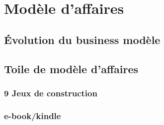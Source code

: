 
\section[Modèle d'affaire]{Modèle d'affaires}

\subsection[Évolution du business modèle]{Évolution du business modèle}
\begin{frame}
\end{frame}

\subsection[Toile de modèle d'affaire]{Toile de modèle d'affaires}
\subsubsection[9 Jeux de construction]{9 Jeux de construction}
\begin{frame}
\end{frame}

\subsubsection[e-book/kindle]{e-book/kindle}
\begin{frame}
\end{frame}
